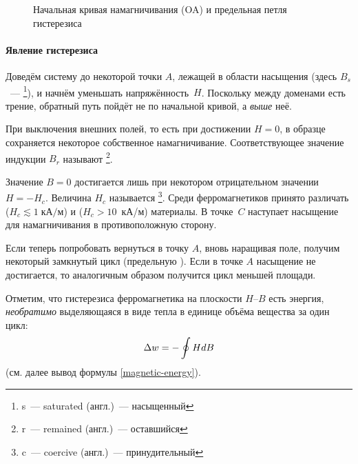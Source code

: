 \begin{figure}[h!]
    \centering
    \caption{Начальная кривая намагничивания (OA) и предельная петля гистерезиса}
\end{figure}

\paragraph{Явление гистерезиса}

Доведём систему до некоторой точки $A$, лежащей в области
насыщения (здесь $B_s$~--- \footnote[1]{s~--- saturated
(англ.)~--- насыщенный}), и начнём уменьшать напряжённость~$H$.
Поскольку между доменами есть трение, обратный путь
пойдёт не по начальной кривой, а \emph{выше} неё.

При выключения внешних полей, то есть при достижении $H = 0$,
в образце сохраняется некоторое собственное намагничивание.
Соответствующее значение индукции $B_r$
называют \footnote[2]{r~--- remained (англ.)~--- оставшийся}.

Значение $B = 0$ достигается лишь при некотором отрицательном значении
$H = - H_c$. Величина $H_c$ называется
\footnote[3]{c~--- coercive (англ.)~--- принудительный}.
Среди ферромагнетиков принято различать  
($H_c \lesssim 1\;кА/м$) и  ($H_c > 10$~кА/м) материалы. 
В точке~$C$ наступает насыщение для намагничивания в противоположную сторону.

Если теперь попробовать вернуться в точку $A$, вновь наращивая поле,
получим некоторый замкнутый цикл (предельную ). Если
в точке $A$ насыщение не достигается, то аналогичным образом  получится
цикл меньшей площади.

Отметим, что  гистерезиса ферромагнетика на плоскости
$H$--$B$ есть энергия, \emph{необратимо} выделяющаяся в виде 
тепла в единице объёма вещества за один цикл:
\begin{equation}
    \eqmark{HdB}
    \Delta w = -\oint {HdB}
\end{equation}
(см. далее вывод формулы \eqref{magnetic-energy}).

